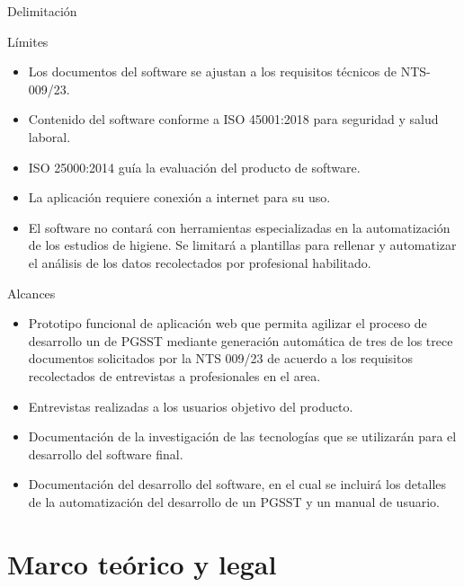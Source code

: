 \documentclass[spanish]{beamer} %
\begin{document}
\begin{frame}[allowframebreaks]{Delimitación}
  \begin{block}{Límites}
  \begin{itemize}
    \item Los documentos del software se ajustan a los requisitos técnicos de NTS-009/23.
    \item Contenido del software conforme a ISO 45001:2018 para seguridad y salud laboral.
    \item ISO 25000:2014 guía la evaluación del producto de software.
    \item La aplicación requiere conexión a internet para su uso.
    \item El software no contará con herramientas especializadas en la automatización de los estudios de higiene. Se limitará a plantillas para rellenar y automatizar el análisis de los datos recolectados por profesional habilitado.
  \end{itemize}
  \end{block}
  \framebreak
  \begin{block}{Alcances}
  \begin{itemize}
    \item Prototipo funcional de aplicación web que permita agilizar el proceso de desarrollo un de PGSST mediante generación automática de tres de los trece documentos solicitados por la NTS 009/23 de acuerdo a los requisitos recolectados de entrevistas a profesionales en el area.
    \item Entrevistas realizadas a los usuarios objetivo del producto.
    \item Documentación de la investigación de las tecnologías que se utilizarán para el
    desarrollo del software final.
    \item Documentación del desarrollo del software, en el cual se incluirá los detalles de la automatización del desarrollo de un PGSST y un manual de usuario.
  \end{itemize}
  \end{block}
\end{frame}

\section{Marco teórico y legal}
\end{document}
